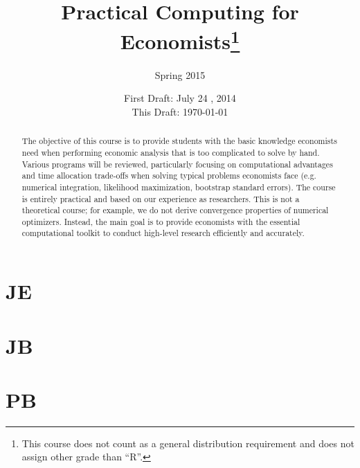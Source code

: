 




\title{\textbf{Practical Computing for Economists}\footnote{This course does not count as a general distribution requirement and does not assign other grade than ``R''. }}
\author{Spring 2015}
\date{First Draft: July 24 , 2014 \\ This Draft: \today}
\maketitle

\begin{abstract}
\noindent The objective of this course is to provide students with the basic knowledge economists need when performing economic analysis that is too complicated to solve by hand. Various programs will be reviewed, particularly focusing on computational advantages and time allocation trade-offs when solving typical problems economists face (e.g. numerical integration, likelihood maximization, bootstrap standard errors). The course is entirely practical and based on our experience as researchers. This is not a theoretical course; for example, we do not derive convergence properties of numerical optimizers. Instead, the main goal is to provide economists with the essential computational toolkit to conduct high-level research efficiently and accurately.
\end{abstract}


\section{JE}

\section{JB}

\section{PB}


